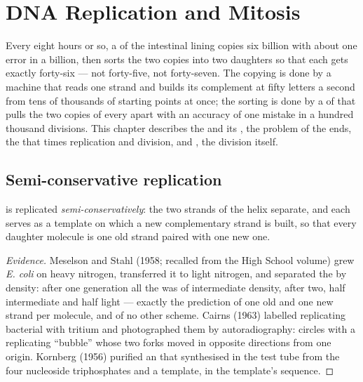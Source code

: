 \chapter{DNA Replication and Mitosis}\label{ch:b1:replication-mitosis}

Every eight hours or so, a  of the intestinal lining copies six
billion  with about one error in a billion, then sorts the
two copies into two daughters so that each gets exactly forty-six
 --- not forty-five, not forty-seven. The copying is done
by a machine that reads one strand and builds its complement at fifty
letters a second from tens of thousands of starting points at once;
the sorting is done by a  of  that pulls the two
copies of every  apart with an accuracy of one mistake in
a hundred thousand divisions. This chapter describes the  and its , the problem of the ends, the  that
times replication and division, and , the division itself.

\section{Semi-conservative replication}

\begin{proposition}\label{prop:b1:replication-mitosis:semiconservative}
 is replicated \emph{semi-conservatively}: the two strands of the
helix separate, and each serves as a template on which a new
complementary strand is built, so that every daughter molecule is one
old strand paired with one new one.
\end{proposition}
\begin{proof}[Evidence]
Meselson and Stahl (1958; recalled from the High School volume) grew
\emph{E. coli} on heavy nitrogen, transferred it to light nitrogen,
and separated the  by density: after one generation all the 
was of intermediate density, after two, half intermediate and half
light --- exactly the prediction of one old and one new strand per
molecule, and of no other scheme. Cairns (1963) labelled replicating
bacterial  with tritium and photographed them by
autoradiography: circles with a replicating ``bubble'' whose two forks
moved in opposite directions from one origin. Kornberg (1956) purified
an  that synthesised  in the test tube from the four
nucleoside triphosphates and a template, in the template's sequence.
\end{proof}

